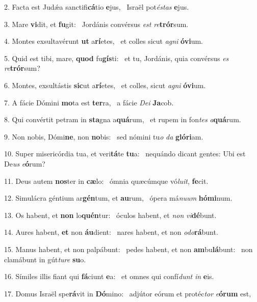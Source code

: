 2. Facta est Judǽa sanctifi\textbf{cá}tio \textbf{e}jus, \ast\  Israël pot\textit{és}\textit{tas} \textbf{e}jus.\

3. Mare \textbf{vi}dit, et \textbf{fu}git: \ast\  Jordánis convérsus \textit{est} \textit{re}\textbf{trór}sum.\

4. Montes exsultavérunt \textbf{ut} a\textbf{rí}etes, \ast\  et colles sicut \textit{a}\textit{gni} \textbf{ó}\textbf{vi}um.\

5. Quid est tibi, mare, \textbf{quod} fu\textbf{gís}ti: \ast\  et tu, Jordánis, quia convérsus \textit{es} \textit{re}\textbf{trór}sum?\

6. Montes, exsultástis \textbf{sic}ut a\textbf{rí}etes, \ast\  et colles, sicut \textit{a}\textit{gni} \textbf{ó}\textbf{vi}um.\

7. A fácie Dómini \textbf{mo}ta est \textbf{ter}ra, \ast\  a fácie \textit{De}\textit{i} \textbf{Ja}cob.\

8. Qui convértit petram in \textbf{sta}gna a\textbf{quá}rum, \ast\  et rupem in fon\textit{tes} \textit{a}\textbf{quá}rum.\

9. Non nobis, Dómi\textbf{ne}, non \textbf{no}bis: \ast\  sed nómini tu\textit{o} \textit{da} \textbf{gló}\textbf{ri}am.\

10. Super misericórdia tua, et veri\textbf{tá}te \textbf{tu}a: \ast\  nequándo dicant gentes: Ubi est De\textit{us} \textit{e}\textbf{ó}rum?\

11. Deus autem \textbf{nos}ter in \textbf{cæ}lo: \ast\  ómnia quæcúmque vó\textit{lu}\textit{it}, \textbf{fe}cit.\

12. Simulácra géntium ar\textbf{gén}tum, et \textbf{au}rum, \ast\  ópera má\textit{nu}\textit{um} \textbf{hó}\textbf{mi}num.\

13. Os habent, et \textbf{non} lo\textbf{quén}tur: \ast\  óculos habent, et \textit{non} \textit{vi}\textbf{dé}bunt.\

14. Aures habent, \textbf{et} non \textbf{áu}dient: \ast\  nares habent, et non \textit{o}\textit{do}\textbf{rá}bunt.\

15. Manus habent, et non palpábunt: \dag\  pedes habent, et non \textbf{am}bu\textbf{lá}bunt: \ast\  non clamábunt in gút\textit{tu}\textit{re} \textbf{su}o.\

16. Símiles illis fiant qui \textbf{fá}ciunt \textbf{e}a: \ast\  et omnes qui confí\textit{dunt} \textit{in} \textbf{e}is.\

17. Domus Israël spe\textbf{rá}vit in \textbf{Dó}mino: \ast\  adjútor eórum et protéc\textit{tor} \textit{e}\textbf{ó}\textbf{rum} est,\


